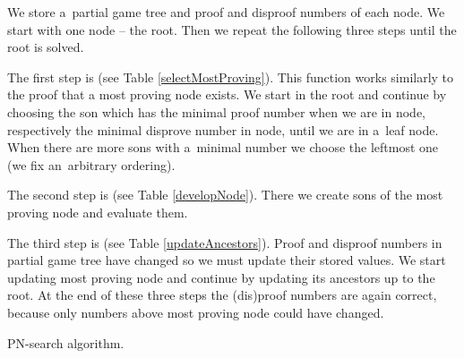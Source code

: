 We store a~partial game tree and proof and disproof numbers of each node. We
start with one node -- the root. Then we repeat the following three steps
until the root is solved. 

\medskip

The first step is  (see Table
\ref{selectMostProving}). This function works similarly to the proof that a
most proving node exists.  We start in the root and continue by
choosing the son which has the minimal proof number when we are in 
node, respectively the minimal disprove number in  node, until we are
in a~leaf node. When there are more sons with a~minimal number we choose the
leftmost one (we fix an~arbitrary ordering). 

The second step is  (see Table
\ref{developNode}). There we create sons of the most proving node and evaluate
them.

The third step is  (see Table
\ref{updateAncestors}). Proof and disproof numbers in partial game tree have
changed so we must update their stored values. We start updating most proving
node and continue by updating its ancestors up to the root. At the end of these
three steps the (dis)proof numbers are again correct, because only numbers
above most proving node could have changed.

\begin{table}
  \begin{itemize*}
    \item [] 
    \item [] 
    \item [] 
      \begin{itemize*}
      \item [] 
      \item [] 
      \item [] 
      \end{itemize*}
    \item [] 
    \item [] 
    \item [] 
    \item [] 
  \end{itemize*}
\caption{PN-search algorithm.}
\label{pn-searchcode}
\end{table}

